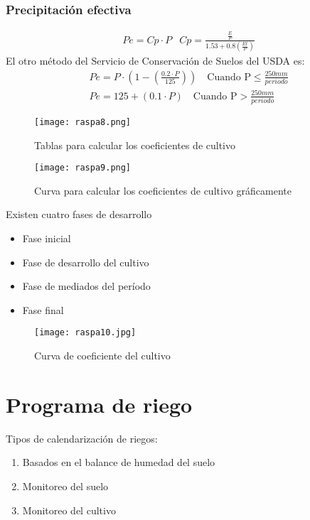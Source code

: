 \subsubsection{Precipitación efectiva}
\begin{align*}
    &Pe = Cp \cdot P
    &Cp = \frac{\frac{E}{P}}{1.53 + 0.8\left(\frac{Et}{P}\right)}
\end{align*}
El otro método del Servicio de Conservación de Suelos del USDA es:
\begin{align*}
    &Pe = P \cdot \left(1 -\left(\frac{0.2 \cdot P}{125}\right) \right)\quad \text{Cuando P} \leq \frac{250mm}{periodo}\\
    &Pe = 125 +(0.1 \cdot P)\quad \text{Cuando P} > \frac{250mm}{periodo}
\end{align*}
\begin{figure}[h!]
\centering
  \texttt{[image: raspa8.png]}
  \caption{Tablas para calcular los coeficientes de cultivo}
  \label{raspa8}
\end{figure}
\begin{figure}[h!]
\centering
  \texttt{[image: raspa9.png]}
  \caption{Curva para calcular los coeficientes de cultivo gráficamente}
  \label{raspa9}
\end{figure}
Existen cuatro fases de desarrollo
\begin{itemize}
    \item Fase inicial
    \item Fase de desarrollo del cultivo
    \item Fase de mediados del período
    \item Fase final
\end{itemize}
\begin{figure}[h!]
\centering
  \texttt{[image: raspa10.jpg]}
  \caption{Curva de coeficiente del cultivo}
  \label{raspa10}
\end{figure}
\section{Programa de riego}
Tipos de calendarización de riegos:
\begin{enumerate}
    \item Basados en el balance de humedad del suelo
    \item Monitoreo del suelo
    \item Monitoreo del cultivo
\end{enumerate}

